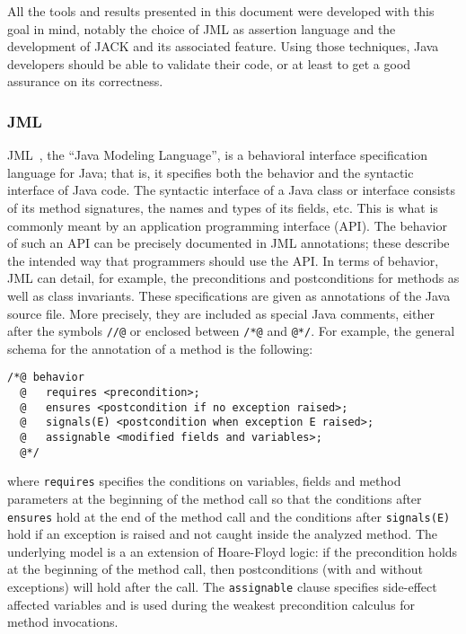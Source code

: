 All the tools and results presented in this document were developed
with this goal in mind, notably the choice of JML as assertion
language and the development of JACK and its associated feature.
Using those techniques, Java developers should be able to validate
their code, or at least to get a good assurance on its correctness.


\subsubsection{JML}
JML~\cite{Leavens-Baker-Ruby99b,Leavens-Baker-Ruby03}, the ``Java
Modeling Language'', is a behavioral interface specification language
for Java; that is, it specifies both the behavior and the syntactic
interface of Java code.  The syntactic interface of a Java class or
interface consists of its method signatures, the names and types of
its fields, etc.  This is what is commonly meant by an application
programming interface (API).  The behavior of such an API can be
precisely documented in JML annotations; these describe the intended
way that programmers should use the API.  In terms of behavior, JML
can detail, for example, the preconditions and postconditions for
methods as well as class invariants. These specifications are given as
annotations of the Java source file. More precisely, they are included
as special Java comments, either after the symbols \lstinline!//@! or
enclosed between \lstinline!/*@! and
\lstinline[basicstyle=\normalfont\ttfamily\small\sl]!@*/!. For example,
the general schema for the annotation of a method is the following:
\begin{lstlisting}
/*@ behavior
  @   requires <precondition>;
  @   ensures <postcondition if no exception raised>;
  @   signals(E) <postcondition when exception E raised>;
  @   assignable <modified fields and variables>;
  @*/
\end{lstlisting}
where \lstinline!requires! specifies the conditions on variables, fields
and method parameters at the beginning of the method call so that the
conditions after \lstinline!ensures! hold at the end of the method
call and the conditions after \lstinline!signals(E)! hold if an
exception is raised and not caught inside the analyzed method.  The
underlying model is a an extension of Hoare-Floyd logic: if the
precondition holds at the beginning of the method call, then
postconditions (with and without exceptions) will hold after the
call. The \lstinline!assignable! clause specifies side-effect affected
variables and is used during the weakest precondition calculus for
method invocations.

